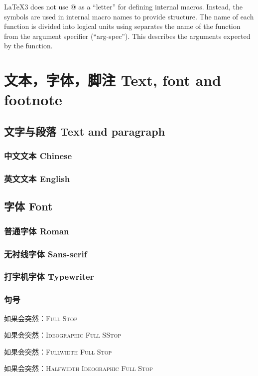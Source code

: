 \begin{abstract*}
\LaTeX3 does not use @ as a ``letter'' for defining internal
macros. Instead, the symbols are used in internal macro names to
provide structure. The name of each function is divided into
logical units using separates the name of the function from the
argument specifier (``arg-spec''). This describes the arguments
expected by the function.
\end{abstract*}

\mainmatter
\chapter{文本，字体，脚注 \quad Text, font and footnote}
\section{文字与段落 Text and paragraph}
\subsection{中文文本 Chinese}
\zhlipsum

\subsection{英文文本 English}
\kant

\clearpage

\section{字体 Font}
\subsection{普通字体 Roman}
\fonttest

\subsection{无衬线字体 Sans-serif}
\textsf{\fonttest}

\subsection{打字机字体 Typewriter}
\texttt{\fonttest}

\subsection{句号}
如果会突然：\textsc{Full Stop} \par
如果会突然：\textsc{Ideographic Full SStop} \par
如果会突然：\textsc{Fullwidth Full Stop} \par
如果会突然：\textsc{Halfwidth Ideographic Full Stop} \par

